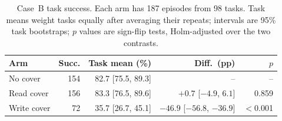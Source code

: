 \begin{table}[t]\centering\footnotesize
\caption{Case~B task success. Each arm has 187 episodes from 98 tasks. Task means weight tasks equally after averaging their repeats; intervals are 95\% task bootstraps; $p$ values are sign-flip tests, Holm-adjusted over the two contrasts.}\label{tab:case-b}
\setlength{\tabcolsep}{3pt}
\begin{tabular}{@{}lrrrr@{}}\toprule
Arm & Succ. & Task mean (\%) & Diff.\ (pp) & $p$\\\midrule
No cover & 154 & 82.7 [75.5, 89.3] & -- & --\\
Read cover & 156 & 83.3 [76.5, 89.6] & $+0.7$ [$-4.9$, $6.1$] & 0.859\\
Write cover & 72 & 35.7 [26.7, 45.1] & $-46.9$ [$-56.8$, $-36.9$] & $<$0.001\\
\bottomrule\end{tabular}\end{table}
